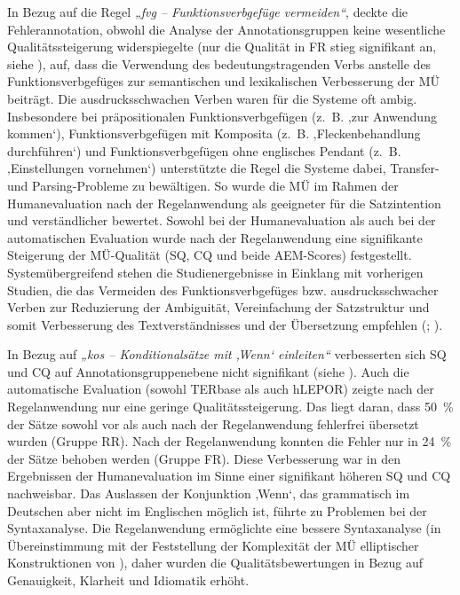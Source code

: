 In Bezug auf die Regel \textit{„fvg -- Funktionsverbgefüge vermeiden“}, deckte die Fehlerannotation, obwohl die Analyse der Annotationsgruppen keine wesentliche Qualitätssteigerung widerspiegelte (nur die Qualität in FR stieg signifikant an, siehe ), auf, dass die Verwendung des bedeutungstragenden Verbs anstelle des Funktionsverbgefüges zur semantischen und lexikalischen Verbesserung der MÜ beiträgt. Die ausdrucksschwachen Verben waren für die Systeme oft ambig. Insbesondere bei präpositionalen Funktionsverbgefügen (z.~B. ‚zur Anwendung kommen‘), Funktionsverbgefügen mit Komposita (z.~B. ‚Fleckenbehandlung durchführen‘) und Funktionsverbgefügen ohne englisches Pendant (z.~B. ‚Einstellungen vornehmen‘) unterstützte die Regel die Systeme dabei, Trans\-fer- und Parsing-Probleme zu bewältigen. So wurde die MÜ im Rahmen der Humanevaluation nach der Regelanwendung als geeigneter für die Satzintention und verständlicher bewertet. Sowohl bei der Humanevaluation als auch bei der automatischen Evaluation wurde nach der Regelanwendung eine signifikante Steigerung der MÜ-Qualität (SQ, CQ und beide AEM-Scores) festgestellt. Systemübergreifend stehen die Studienergebnisse in Einklang mit vorherigen Studien, die das Vermeiden des Funktionsverbgefüges bzw. ausdrucksschwacher Verben zur Reduzierung der Ambiguität, Vereinfachung der Satzstruktur und somit Verbesserung des Textverständnisses und der Übersetzung empfehlen (\citealt{Siegel2011}; \citealt{Congree2018}).

In Bezug auf \textit{„kos -- Konditionalsätze mit ‚Wenn‘ einleiten“} verbesserten sich SQ und CQ auf Annotationsgruppenebene nicht signifikant (siehe ). Auch die automatische Evaluation (sowohl TERbase als auch hLEPOR) zeigte nach der Regelanwendung nur eine geringe Qualitätssteigerung. Das liegt daran, dass 50~\% der Sätze sowohl vor als auch nach der Regelanwendung fehlerfrei übersetzt wurden (Gruppe RR). Nach der Regelanwendung konnten die Fehler nur in 24~\% der Sätze behoben werden (Gruppe FR). Diese Verbesserung war in den Ergebnissen der Humanevaluation im Sinne einer signifikant höheren SQ und CQ nachweisbar. Das Auslassen der Konjunktion ‚Wenn‘, das grammatisch im Deutschen aber nicht im Englischen möglich ist, führte zu Problemen bei der Syntaxanalyse. Die Regelanwendung ermöglichte eine bessere Syntaxanalyse (in Übereinstimmung mit der Feststellung der Komplexität der MÜ elliptischer Konstruktionen von \citealt{Reuther2003}), daher wurden die Qualitätsbewertungen in Bezug auf Genauigkeit, Klarheit und Idiomatik erhöht.

